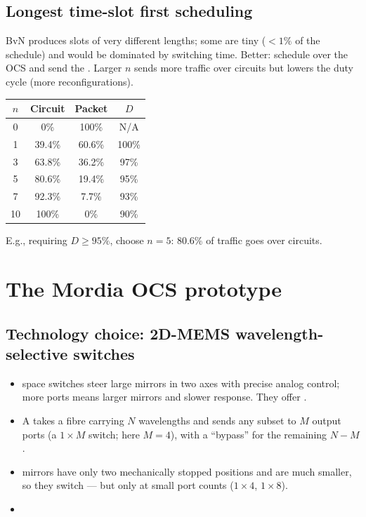 \subsection{Longest time-slot first scheduling}
BvN produces slots of very different lengths; some are tiny ($<1\%$ of the schedule) and would be dominated by switching time. Better: schedule  over the OCS and send the . Larger $n$ sends more traffic over circuits but lowers the duty cycle (more reconfigurations).
\begin{center}
\begin{tabular}{@{}cccc@{}}
\toprule
$n$ & Circuit & Packet & $D$ \\
\midrule
0 & 0\% & 100\% & N/A \\
1 & 39.4\% & 60.6\% & 100\% \\
3 & 63.8\% & 36.2\% & 97\% \\
5 & 80.6\% & 19.4\% & 95\% \\
7 & 92.3\% & 7.7\% & 93\% \\
10 & 100\% & 0\% & 90\% \\
\bottomrule
\end{tabular}
\end{center}
E.g., requiring $D\ge 95\%$, choose $n=5$: 80.6\% of traffic goes over circuits.

\section{The Mordia OCS prototype}
\subsection{Technology choice: 2D-MEMS wavelength-selective switches}
\begin{itemize}
\item {} space switches steer large mirrors in two axes with precise analog control; more ports means larger mirrors and slower response. They offer .
\item A  takes a fibre carrying $N$ wavelengths and sends any subset to $M$ output ports (a $1\times M$ switch; here $M=4$), with a ``bypass'' for the remaining $N-M$.
\item {} mirrors have only two mechanically stopped positions and are much smaller, so they switch  --- but only at small port counts ($1\times4$, $1\times8$).
\item {}
\end{itemize}

